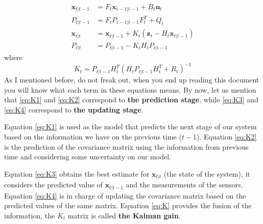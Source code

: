 \documentclass[12pt,a4paper,final]{article} %
\newcommand{\vect}[1]{\mathbf{#1}}
\begin{document}
\begin{align}
  \vect{x}_{t|t-1} &= F_t \vect{x}_{t-1|t-1} + B_t \vect{u}_t \label{eq:K1}\\
  P_{t|t-1} &= F_t P_{t-1|t-1} F_t^T + Q_t \label{eq:K2}\\
  \vect{x}_{t|t} &= \vect{x}_{t|t-1} + K_t (\vect{z}_t - H_t \vect{x}_{t|t-1}) \label{eq:K3}\\
  P_{t|t} &= P_{t|t-1} - K_t H_t P_{t|t-1} \label{eq:K4}
\end{align}
where
\begin{equation}
  \label{eq:K}
  K_t= P_{t|t-1} H_t^T (H_t P_{t|t-1} H_t^T+R_t)^{-1}
\end{equation}
As I mentioned before, do not freak out, when you end up reading this
document you will know what each term in these equations means. By
now, let us mention that \eqref{eq:K1} and \eqref{eq:K2} correspond to
\textbf{the prediction stage}, while \eqref{eq:K3} and \eqref{eq:K4}
correspond to \textbf{the updating stage}.

Equation \eqref{eq:K1} is used as the model that predicts the next
stage of our system based on the information we have on the previous
time ($t-1$). Equation \eqref{eq:K2} is the prediction of the
covariance matrix using the information from previous time and
considering some uncertainty on our model.

Equation \eqref{eq:K3} obtains the best estimate for $\vect{x}_{t|t}$
(the state of the system), it considers the predicted value of
$\vect{x}_{t|t-1}$ and the measurements of the sensors. Equation
\eqref{eq:K4} is in charge of updating the covariance matrix based on
the predicted values of the same matrix. Equation \eqref{eq:K}
provides the fusion of the information, the $K_t$ matrix is called
\textbf{the Kalman gain}.
\end{document}
